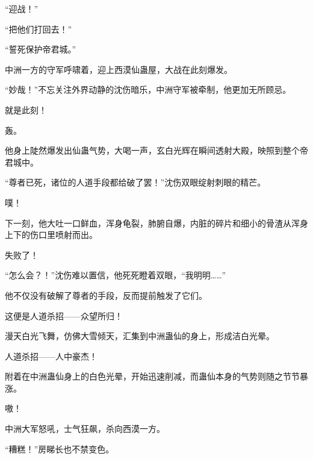 \begin{this_body}
“迎战！”

“把他们打回去！”

“誓死保护帝君城。”

中洲一方的守军呼啸着，迎上西漠仙蛊屋，大战在此刻爆发。

“妙哉！”不忘关注外界动静的沈伤暗乐，中洲守军被牵制，他更加无所顾忌。

就是此刻！

轰。

他身上陡然爆发出仙蛊气势，大喝一声，玄白光辉在瞬间透射大殿，映照到整个帝君城中。

“尊者已死，诸位的人道手段都给破了罢！”沈伤双眼绽射刺眼的精芒。

噗！

下一刻，他大吐一口鲜血，浑身龟裂，肺腑自爆，内脏的碎片和细小的骨渣从浑身上下的伤口里喷射而出。

失败了！

“怎么会？！”沈伤难以置信，他死死瞪着双眼，“我明明……”

他不仅没有破解了尊者的手段，反而提前触发了它们。

这便是人道杀招——众望所归！

漫天白光飞舞，仿佛大雪倾天，汇集到中洲蛊仙的身上，形成洁白光晕。

人道杀招——人中豪杰！

附着在中洲蛊仙身上的白色光晕，开始迅速削减，而蛊仙本身的气势则随之节节暴涨。

嗷！

中洲大军怒吼，士气狂飙，杀向西漠一方。

“糟糕！”房睇长也不禁变色。

\end{this_body}

